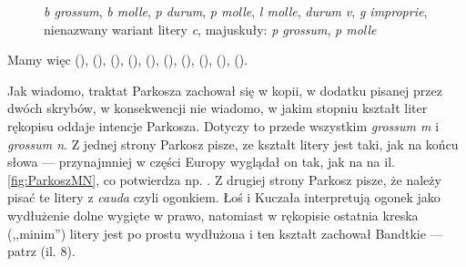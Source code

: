         \begin{figure}[ht]
    \centering
{
  {}
  {}
  {}
  {}
  {}
  {}
  {}
  {}
  {}
  {}
  {}
  {}

  {}
  {}
  {}
  {}
  {}
  {}
  {}
  {}
  {}
  {}
  {}
  {}

  {}
  {}
  {}
  {}
  {}
  {}
}
\caption{\textit{b grossum}, \textit{b molle}, \textit{p durum},
  \textit{p molle}, \textit{l molle}, \textit{durum v}, \textit{g
    improprie}, nienazwany wariant litery \textit{c}, majuskuły:
  \textit{p grossum}, \textit{p molle}}
    \label{fig:Parkosz}
  \end{figure}

  Mamy więc {} ({}),
  {} ({}),
  {} ({}),
  {} ({}),
  {} ({}),
  {} ({}),
  {} ({}),
  {} ({}),
  {} ({}),
  {} ({}).
  
  Jak wiadomo, traktat Parkosza zachował się w kopii, w dodatku
  pisanej przez dwóch skrybów, w konsekwencji nie wiadomo, w jakim
  stopniu kształt liter rękopisu oddaje intencje Parkosza. Dotyczy to
  przede wszystkim \textit{grossum m} i \textit{grossum n}.  Z jednej
  strony Parkosz pisze, ze kształt litery jest taki, jak na końcu
  słowa --- przynajmniej w części Europy wyglądał on tak, jak na na
  il. \vref{fig:ParkoszMN}, co potwierdza
  np. \autocite{emiliano:_the_portug_mediev_font_projec}. Z drugiej
  strony Parkosz pisze, że należy pisać te litery z \textit{cauda}
  czyli ogonkiem. Łoś i Kuczała interpretują ogonek jako wydłużenie
  dolne wygięte w prawo, natomiast w rękopisie ostatnia kreska
  (,,minim'') litery jest po prostu wydłużona i ten kształt zachował
  Bandtkie --- patrz \autocite[s.41]{bień22:_parkosT} (il. 8).
  
